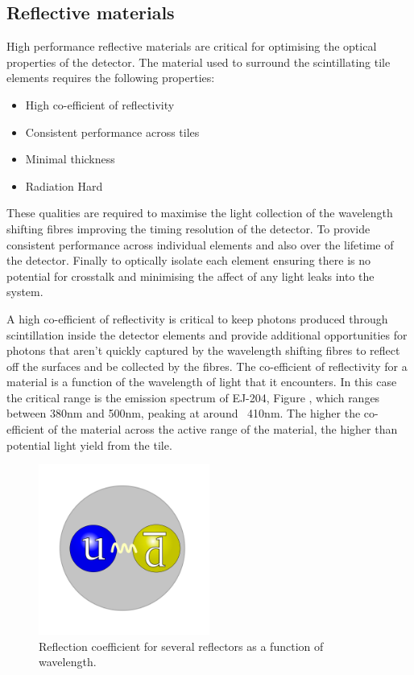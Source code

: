 \subsection{Reflective materials}

High performance reflective materials are critical for optimising the optical properties of the detector. The material used to surround the scintillating tile elements requires the following properties:
\begin{itemize}
	\item High co-efficient of reflectivity  
	\item Consistent performance across tiles
	\item Minimal thickness
	\item Radiation Hard
\end{itemize}

These qualities are required to maximise the light collection of the wavelength shifting fibres improving the timing resolution of the detector. To provide consistent performance across individual elements and also over the lifetime of the detector. Finally to optically isolate each element ensuring there is no potential for crosstalk and minimising the affect of any light leaks into the system.

A high co-efficient of reflectivity is critical to keep photons produced through scintillation inside the detector elements and provide additional opportunities for photons that aren't quickly captured by the wavelength shifting fibres to reflect off the surfaces and be collected by the fibres. The co-efficient of reflectivity for a material is a function of the wavelength of light that it encounters. In this case the critical range is the emission spectrum of EJ-204, Figure , which ranges between 380nm and 500nm, peaking at around ~410nm. The higher the co-efficient of the material across the active range of the material, the higher than potential light yield from the tile.


\begin{figure}[!ht]
	\centering
	\includegraphics[width=0.5\textwidth]{ImgChap1/Meson2}
	\caption{Reflection coefficient for several reflectors as a function of wavelength.  \cite{janecek2012reflectivity}}
	\label{ReflCoef}
\end{figure}

